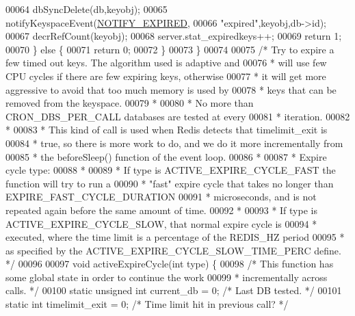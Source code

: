 \begin{DoxyCode}
00064             dbSyncDelete(db,keyobj);
00065         notifyKeyspaceEvent(\hyperlink{server_8h_a6b6b55f4f6ffcd0b1648395fea5fafc1}{NOTIFY\_EXPIRED},
00066             \textcolor{stringliteral}{"expired"},keyobj,db->id);
00067         decrRefCount(keyobj);
00068         server.stat\_expiredkeys++;
00069         \textcolor{keywordflow}{return} 1;
00070     \} \textcolor{keywordflow}{else} \{
00071         \textcolor{keywordflow}{return} 0;
00072     \}
00073 \}
00074 
00075 \textcolor{comment}{/* Try to expire a few timed out keys. The algorithm used is adaptive and}
00076 \textcolor{comment}{ * will use few CPU cycles if there are few expiring keys, otherwise}
00077 \textcolor{comment}{ * it will get more aggressive to avoid that too much memory is used by}
00078 \textcolor{comment}{ * keys that can be removed from the keyspace.}
00079 \textcolor{comment}{ *}
00080 \textcolor{comment}{ * No more than CRON\_DBS\_PER\_CALL databases are tested at every}
00081 \textcolor{comment}{ * iteration.}
00082 \textcolor{comment}{ *}
00083 \textcolor{comment}{ * This kind of call is used when Redis detects that timelimit\_exit is}
00084 \textcolor{comment}{ * true, so there is more work to do, and we do it more incrementally from}
00085 \textcolor{comment}{ * the beforeSleep() function of the event loop.}
00086 \textcolor{comment}{ *}
00087 \textcolor{comment}{ * Expire cycle type:}
00088 \textcolor{comment}{ *}
00089 \textcolor{comment}{ * If type is ACTIVE\_EXPIRE\_CYCLE\_FAST the function will try to run a}
00090 \textcolor{comment}{ * "fast" expire cycle that takes no longer than EXPIRE\_FAST\_CYCLE\_DURATION}
00091 \textcolor{comment}{ * microseconds, and is not repeated again before the same amount of time.}
00092 \textcolor{comment}{ *}
00093 \textcolor{comment}{ * If type is ACTIVE\_EXPIRE\_CYCLE\_SLOW, that normal expire cycle is}
00094 \textcolor{comment}{ * executed, where the time limit is a percentage of the REDIS\_HZ period}
00095 \textcolor{comment}{ * as specified by the ACTIVE\_EXPIRE\_CYCLE\_SLOW\_TIME\_PERC define. */}
00096 
00097 \textcolor{keywordtype}{void} activeExpireCycle(\textcolor{keywordtype}{int} type) \{
00098     \textcolor{comment}{/* This function has some global state in order to continue the work}
00099 \textcolor{comment}{     * incrementally across calls. */}
00100     \textcolor{keyword}{static} \textcolor{keywordtype}{unsigned} \textcolor{keywordtype}{int} current\_db = 0; \textcolor{comment}{/* Last DB tested. */}
00101     \textcolor{keyword}{static} \textcolor{keywordtype}{int} timelimit\_exit = 0;      \textcolor{comment}{/* Time limit hit in previous call? */}

\end{DoxyCode}
